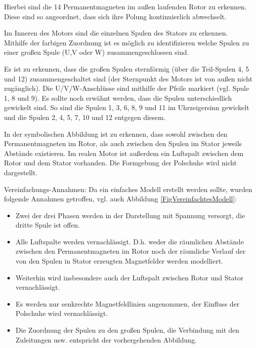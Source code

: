 Hierbei sind die 14 Permanentmagneten im außen laufenden Rotor zu erkennen. Diese sind so angeordnet, dass sich ihre Polung kontinuierlich abwechselt. 

Im Inneren des Motors sind die einzelnen Spulen des Stators zu erkennen. Mithilfe der farbigen Zuordnung ist es möglich zu identifizieren welche Spulen zu einer großen Spule (U,V oder W) zusammengeschlossen sind. 

Es ist zu erkennen, dass die großen Spulen sternförmig (über die Teil-Spulen 4, 5 und 12) zusammengeschaltet sind (der Sternpunkt des Motors ist von außen nicht zugänglich).
Die U/V/W-Anschlüsse sind mithilfe der Pfeile markiert (vgl. Spule 1, 8 und 9). 
Es sollte noch erwähnt werden, dass die Spulen unterschiedlich gewickelt sind. So sind die Spulen 1, 3, 6, 8, 9 und 11 im Uhrzeigersinn gewickelt und die Spulen 2, 4, 5, 7, 10 und 12 entgegen diesem.

In der symbolischen Abbildung ist zu erkennen, dass sowohl zwischen den Permanentmagneten im Rotor, als auch zwischen den Spulen im Stator jeweils Abstände existieren. 
Im realen Motor ist außerdem ein Luftspalt zwischen dem Rotor und dem Stator vorhanden. 
Die Formgebung der Polschuhe wird nicht dargestellt.


Vereinfachungs-Annahmen: 
Da ein einfaches Modell erstellt werden sollte, wurden folgende Annahmen getroffen, vgl. auch Abbildung \ref{FigVereinfachtesModell}:
\begin{itemize}
	\item Zwei der drei Phasen werden in der Darstellung mit Spannung versorgt, die dritte Spule ist offen.
	\item Alle Luftspalte werden vernachlässigt. D.h. weder die räumlichen Abstände zwischen den Permanentmagneten im Rotor noch der räumliche Verlauf der von den Spulen in Stator erzeugten Magnetfelder werden modelliert. 
	\item Weiterhin wird insbesondere auch der Luftspalt zwischen Rotor und Stator vernachlässigt.
	\item Es werden nur senkrechte Magnetfeldlinien angenommen, der Einfluss der Polschuhe wird vernachlässigt.
	\item Die Zuordnung der Spulen zu den großen Spulen, die Verbindung mit den Zuleitungen usw. entspricht der vorhergehenden Abbildung. 
\end{itemize}

